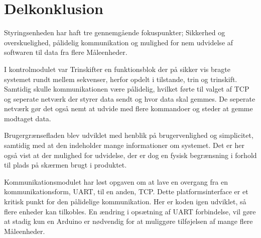 
\section{Delkonklusion}

Styringsenheden har haft tre gennemgående fokuspunkter; Sikkerhed og overskuelighed, pålidelig kommunikation og mulighed for nem udvidelse af softwaren til data fra flere Måleenheder.


I kontrolmodulet var Trinskifter en funktionsblok der på sikker vis bragte systemet rundt mellem sekvenser, herfor opdelt i tilstande, trin og trinskift. Samtidig skulle kommunikationen være pålidelig, hvilket førte til valget af TCP og seperate netværk der styrer data sendt og hvor data skal gemmes. De seperate netværk gør det også nemt at udvide med flere kommandoer og steder at gemme modtaget data.


Brugergrænsefladen blev udviklet med henblik på brugervenlighed og simplicitet, samtidig med at den indeholder mange informationer om systemet. Det er her også vist at der mulighed for udvidelse, der er dog en fysisk begrænsning i forhold til plads på skærmen brugt i produktet.


Kommunikationsmodulet har løst opgaven om at lave en overgang fra en kommunikationsform, UART, til en anden, TCP. Dette platformsinterface er et kritisk punkt for den pålidelige kommunikation. Her er koden igen udviklet, så flere enheder kan tilkobles. En ændring i opsætning af UART forbindelse, vil gøre at stadig kun en Arduino er nødvendig for at muliggøre tilføjelsen af mange flere Måleenheder.
